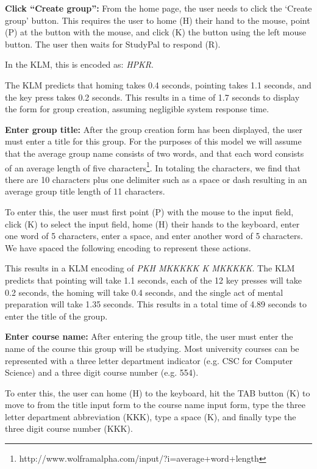 \documentclass[conference]{IEEEtran}
\begin{document}
\textbf{Click ``Create group'':}
From the home page, the user needs to click the `Create group' button.
This requires the user to home (H) their hand to the mouse, point (P) at the button with the mouse, and click (K) the button using the left mouse button.
The user then waits for StudyPal to respond (R).

In the KLM, this is encoded as: \emph{HPKR}.

The KLM predicts that homing takes 0.4 seconds, pointing takes 1.1 seconds, and the key press takes 0.2 seconds.
This results in a time of 1.7 seconds to display the form for group creation, assuming negligible system response time.

\textbf{Enter group title:}
After the group creation form has been displayed, the user must enter a title for this group.
For the purposes of this model we will assume that the average group name consists of two words, and that each word consists of an average length of five characters\footnote{http://www.wolframalpha.com/input/?i=average+word+length}.
In totaling the characters, we find that there are 10 characters plus one delimiter such as a space or dash resulting in an average group title length of 11 characters.

To enter this, the user must first point (P) with the mouse to the input field, click (K) to select the input field, home (H) their hands to the keyboard, enter one word of 5 characters, enter a space, and enter another word of 5 characters.
We have spaced the following encoding to represent these actions.

This results in a KLM encoding of \emph{PKH MKKKKK K MKKKKK}.
The KLM predicts that pointing will take 1.1 seconds, each of the 12 key presses will take 0.2 seconds, the homing will take 0.4 seconds, and the single act of mental preparation will take 1.35 seconds.
This results in a total time of 4.89 seconds to enter the title of the group.

\textbf{Enter course name:}
After entering the group title, the user must enter the name of the course this group will be studying.
Most university courses can be represented with a three letter department indicator (e.g. CSC for Computer Science) and a three digit course number (e.g. 554).

To enter this, the user can home (H) to the keyboard, hit the TAB button (K) to move to from the title input form to the course name input form, type the three letter department abbreviation (KKK), type a space (K), and finally type the three digit course number (KKK).
\end{document}
